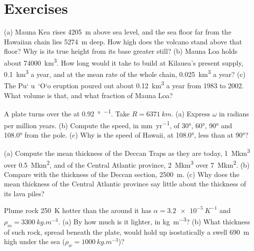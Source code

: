 \section{Exercises}

\begin{exercise}[$\star$]\label{exo:b1:hotspots:1}
(a) Mauna Kea rises \qty{4205}{m} above sea level, and the sea floor far from
the Hawaiian chain lies \qty{5274}{m} deep. How high does the volcano stand
above that floor? Why is its true height from its base greater still?
(b) Mauna Loa holds about \qty{74000}{km^3}. How long would it take to build
at Kilauea's present supply, \qty{0.1}{km^3} a year, and at the mean rate of
the whole chain, \qty{0.025}{km^3} a year? (c) The Pu\textquoteleft
u~\textquoteleft O\textquoteleft o eruption poured out about \qty{0.12}{km^3}
a year from 1983 to 2002. What volume is that, and what fraction of Mauna Loa?
\end{exercise}

\begin{exercise}[$\star$]\label{exo:b1:hotspots:2}
A plate turns over the  at \qty{0.92}{\degree\per\Myr}. Take
$R = \qty{6371}{km}$. (a) Express $\omega$ in radians per million years. (b)
Compute the speed, in \unit{mm.yr^{-1}}, of  \ang{30}, \ang{60},
\ang{90} and \ang{108.0} from the pole. (c) Why is the speed of Hawaii, at
\ang{108.0}, less than at \ang{90}?
\end{exercise}

\begin{exercise}[$\star$]\label{exo:b1:hotspots:3}
(a) Compute the mean thickness of the Deccan Traps as they are today,
\qty{1}{\mega km^3} over \qty{0.5}{\mega km^2}, and of the Central Atlantic
province, \qty{2}{\mega km^3} over \qty{7}{\mega km^2}. (b) Compare with the
thickness of the Deccan section, \qty{2500}{m}. (c) Why does the mean
thickness of the Central Atlantic province say little about the thickness of
its lava piles?
\end{exercise}

\begin{exercise}[$\star$]\label{exo:b1:hotspots:4}
Plume rock \qty{250}{K} hotter than the  around it has
$\alpha = \qty{3.2e-5}{K^{-1}}$ and $\rho_m = \qty{3300}{kg.m^{-3}}$. (a) By how
much is it lighter, in \unit{kg.m^{-3}}? (b) What thickness of such rock,
spread beneath the plate, would hold up isostatically a swell \qty{690}{m}
high under the sea ($\rho_w = \qty{1000}{kg.m^{-3}}$)?
\end{exercise}

